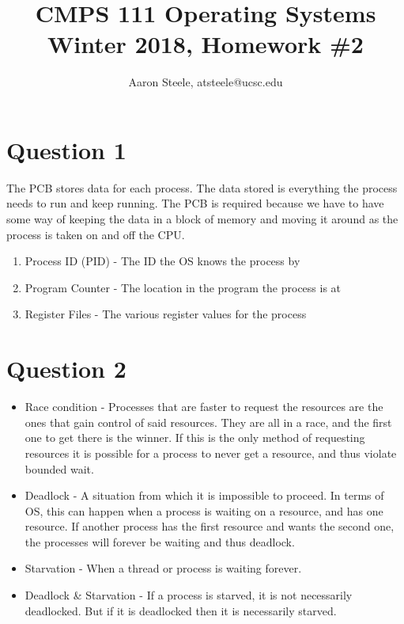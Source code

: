 \documentclass[12pt]{article}
\title{\textbf{CMPS 111 Operating Systems\\ Winter 2018, Homework \#2}}
\date{}
\author{Aaron Steele, atsteele@ucsc.edu}
\begin{document}
	
	\maketitle
	
	\section*{Question 1}
	The PCB stores data for each process. The data stored is everything the process needs to run and keep running.
	The PCB is required because we have to have some way of keeping the data in a block of memory and moving it around as the process is taken on and off the CPU.
	\begin{enumerate}
		\item Process ID (PID) - The ID the OS knows the process by
		\item Program Counter - The location in the program the process is at
		\item Register Files - The various register values for the process
	\end{enumerate}
	
	
	
	\section*{Question 2}
	\begin{itemize}
		\item Race condition - Processes that are faster to request the resources are the ones that gain control of said resources. They are all in a race, and the first one to get there is the winner. If this is the only method of requesting resources it is possible for a process to never get a resource, and thus violate bounded wait.
		\item Deadlock - A situation from which it is impossible to proceed. In terms of OS, this can happen when a process is waiting on a resource, and has one resource. If another process has the first resource and wants the second one, the processes will forever be waiting and thus deadlock.
		\item Starvation - When a thread or process is waiting forever. 
		\item Deadlock \& Starvation - If a process is starved, it is not necessarily deadlocked. But if it is deadlocked then it is necessarily starved.
	\end{itemize}
	
	
\end{document}
